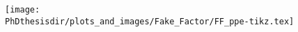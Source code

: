 %
%

\begin{frame}
\begin{center}
\texttt{[image: \\PhDthesisdir/plots\_and\_images/Fake\_Factor/FF\_ppe-tikz.tex]}
\end{center}
\vspace{-4pt}%
\end{frame}